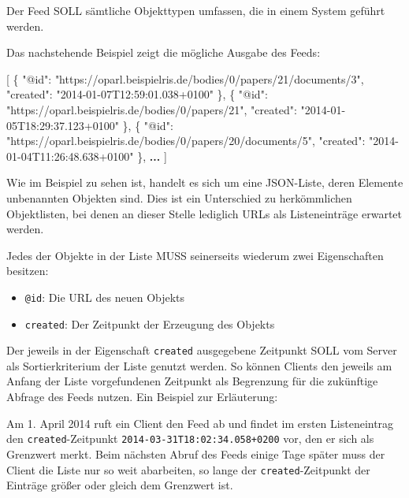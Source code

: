 \documentclass[,a4paper]{article}
\newenvironment{Shaded}{}{}
\newcommand{\DataTypeTok}[1]{\textcolor[rgb]{0.56,0.13,0.00}{{#1}}}
\newcommand{\StringTok}[1]{\textcolor[rgb]{0.25,0.44,0.63}{{#1}}}
\newcommand{\OtherTok}[1]{\textcolor[rgb]{0.00,0.44,0.13}{{#1}}}
\newcommand{\FunctionTok}[1]{\textcolor[rgb]{0.02,0.16,0.49}{{#1}}}
\newcommand{\ErrorTok}[1]{\textcolor[rgb]{1.00,0.00,0.00}{\textbf{{#1}}}}
\begin{document}
Der Feed SOLL sämtliche Objekttypen umfassen, die in einem System
geführt werden.

Das nachstehende Beispiel zeigt die mögliche Ausgabe des Feeds:

\begin{Shaded}
\begin{Highlighting}[]
\OtherTok{[}
    \FunctionTok{\{}
        \DataTypeTok{"@id"}\FunctionTok{:} \StringTok{"https://oparl.beispielris.de/bodies/0/papers/21/documents/3"}\FunctionTok{,}
        \DataTypeTok{"created"}\FunctionTok{:} \StringTok{"2014-01-07T12:59:01.038+0100"}
    \FunctionTok{\}}\OtherTok{,}
    \FunctionTok{\{}
        \DataTypeTok{"@id"}\FunctionTok{:} \StringTok{"https://oparl.beispielris.de/bodies/0/papers/21"}\FunctionTok{,}
        \DataTypeTok{"created"}\FunctionTok{:} \StringTok{"2014-01-05T18:29:37.123+0100"}
    \FunctionTok{\}}\OtherTok{,}
    \FunctionTok{\{}
        \DataTypeTok{"@id"}\FunctionTok{:} \StringTok{"https://oparl.beispielris.de/bodies/0/papers/20/documents/5"}\FunctionTok{,}
        \DataTypeTok{"created"}\FunctionTok{:} \StringTok{"2014-01-04T11:26:48.638+0100"}
    \FunctionTok{\}}\OtherTok{,}
    \ErrorTok{...}
\OtherTok{]}
\end{Highlighting}
\end{Shaded}

Wie im Beispiel zu sehen ist, handelt es sich um eine JSON-Liste, deren
Elemente unbenannten Objekten sind. Dies ist ein Unterschied zu
herkömmlichen Objektlisten, bei denen an dieser Stelle lediglich URLs
als Listeneinträge erwartet werden.

Jedes der Objekte in der Liste MUSS seinerseits wiederum zwei
Eigenschaften besitzen:

\begin{itemize}
\itemsep1pt\parskip0pt
\item
  \texttt{@id}: Die URL des neuen Objekts
\item
  \texttt{created}: Der Zeitpunkt der Erzeugung des Objekts
\end{itemize}

Der jeweils in der Eigenschaft \texttt{created} ausgegebene Zeitpunkt
SOLL vom Server als Sortierkriterium der Liste genutzt werden. So können
Clients den jeweils am Anfang der Liste vorgefundenen Zeitpunkt als
Begrenzung für die zukünftige Abfrage des Feeds nutzen. Ein Beispiel zur
Erläuterung:

Am 1. April 2014 ruft ein Client den Feed ab und findet im ersten
Listeneintrag den \texttt{created}-Zeitpunkt
\texttt{2014-03-31T18:02:34.058+0200} vor, den er sich als Grenzwert
merkt. Beim nächsten Abruf des Feeds einige Tage später muss der Client
die Liste nur so weit abarbeiten, so lange der
\texttt{created}-Zeitpunkt der Einträge größer oder gleich dem Grenzwert
ist.
\end{document}
